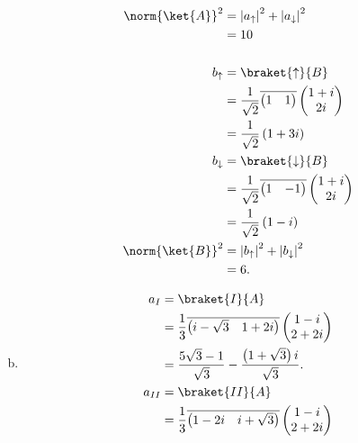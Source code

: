 \documentclass[10pt]{mypackage}
\begin{document}
\begin{enumerate}[(a)]
\begin{align*}
      \norm{\ket{A}}^2 &= \left\vert a_{\uparrow} \right\vert^2 + \left\vert a_{\downarrow} \right\vert^2\\
                       &= 10\\
                       \\
      b_{\uparrow} &= \braket{\uparrow}{B}\\
                     &= \frac{1}{\sqrt{2}} \overline{ \begin{pmatrix}1 & 1\end{pmatrix} } \begin{pmatrix}1+i\\2i\end{pmatrix}\\
                     &= \frac{1}{\sqrt{2}} \left(1 + 3i\right)\\
      b_{\downarrow} &= \braket{\downarrow}{B}\\
                     &= \frac{1}{\sqrt{2}} \overline{ \begin{pmatrix}1 & -1\end{pmatrix} } \begin{pmatrix}1+i\\2i\end{pmatrix}\\
                     &= \frac{1}{\sqrt{2}} \left(1-i\right)\\
      \norm{\ket{B}}^2 &= \left\vert b_{\uparrow} \right\vert^2 + \left\vert b_{\downarrow} \right\vert^2\\
                       &= 6.
    \end{align*}
  \item 
    \begin{align*}
      a_{I} &= \braket{I}{A}\\
            &= \frac{1}{3} \overline{ \begin{pmatrix}i-\sqrt{3} & 1 + 2i\end{pmatrix} } \begin{pmatrix}1-i\\2+2i\end{pmatrix}\\
            &= \frac{5\sqrt{3}-1}{\sqrt{3}} - \frac{\left(1 + \sqrt{3}\right)i}{\sqrt{3}}.\\
      a_{II} &= \braket{II}{A}\\
             &= \frac{1}{3} \overline{ \begin{pmatrix}1 - 2i & i + \sqrt{3}\end{pmatrix} } \begin{pmatrix}1-i\\2+2i\end{pmatrix}\\

\end{align*}
\end{enumerate}
\end{document}
